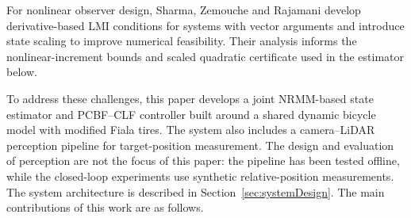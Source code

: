 \documentclass[journal]{IEEEtran}
\theoremstyle{definition}
\begin{document}
For nonlinear observer design, Sharma, Zemouche and Rajamani
\cite{SharmaZemoucheRajamani2026} develop derivative-based LMI conditions
for systems with vector arguments and introduce state scaling to improve
numerical feasibility. Their analysis informs the nonlinear-increment
bounds and scaled quadratic certificate used in the estimator below.

To address these challenges, this paper develops a joint NRMM-based
state estimator and PCBF--CLF controller built around a shared dynamic
bicycle model with modified Fiala tires. The system also includes a
camera--LiDAR perception pipeline for target-position measurement. The
design and evaluation of perception are not the focus of this paper: the
pipeline has been tested offline, while the closed-loop experiments use
synthetic relative-position measurements. The system architecture is
described in Section~\ref{sec:systemDesign}. The main contributions of
this work are as follows.
\end{document}
